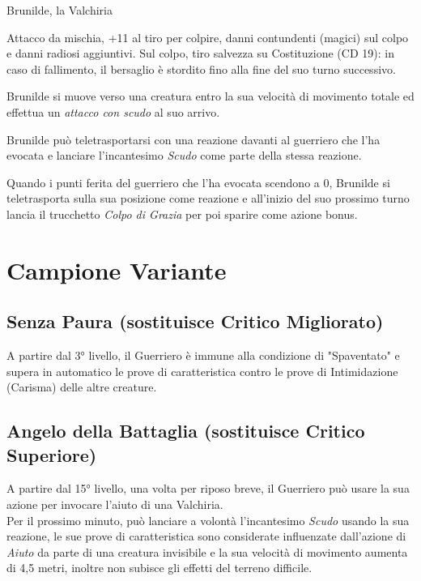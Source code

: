 \begin{DndMonster}[float*=b,width=\textwidth + 8pt]{Brunilde, la Valchiria}
\begin{multicols}{2}
    Attacco da mischia, +11 al tiro per colpire,  danni contundenti (magici) sul colpo e  danni radiosi aggiuntivi. Sul colpo, tiro salvezza su Costituzione (CD 19): in caso di fallimento, il bersaglio è stordito fino alla fine del suo turno successivo.

    
    Brunilde si muove verso una creatura entro la sua velocità di movimento totale ed effettua un \textit{attacco con scudo} al suo arrivo.


    Brunilde può teletrasportarsi con una reazione davanti al guerriero che l'ha evocata e lanciare l'incantesimo \textit{Scudo} come parte della stessa reazione.

    Quando i punti ferita del guerriero che l'ha evocata scendono a 0, Brunilde si teletrasporta sulla sua posizione come reazione e all'inizio del suo prossimo turno lancia il trucchetto \textit{Colpo di Grazia} per poi sparire come azione bonus.
  \end{multicols}
\end{DndMonster}

\section{Campione Variante}

\subsection{Senza Paura (sostituisce Critico Migliorato)}
A partire dal 3° livello, il Guerriero è immune alla condizione di "Spaventato" e supera in automatico le prove di caratteristica contro le prove di Intimidazione (Carisma) delle altre creature.

\subsection{Angelo della Battaglia (sostituisce Critico Superiore)}
A partire dal 15° livello, una volta per riposo breve, il Guerriero può usare la sua azione per invocare l'aiuto di una Valchiria.\\
Per il prossimo minuto, può lanciare a volontà l'incantesimo \textit{Scudo} usando la sua reazione, le sue prove di caratteristica sono considerate influenzate dall'azione di \textit{Aiuto} da parte di una creatura invisibile e la sua velocità di movimento aumenta di 4,5 metri, inoltre non subisce gli effetti del terreno difficile.

